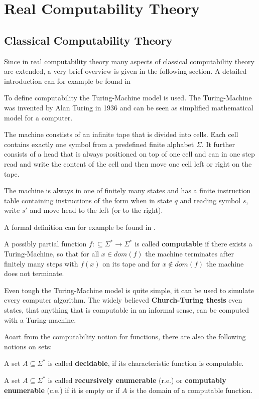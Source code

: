 \section{Real Computability Theory}\label{sec:real computability}
\subsection{Classical Computability Theory}
 Since in real computability theory many aspects of classical computability theory are extended, 
 a very brief overview is given in the following section. 
 A detailed introduction can for example be found in \cite{computability}

 To define computability the Turing-Machine model is used.
 The Turing-Machine was invented by Alan Turing in 1936 \cite{Turing} and can
 be seen as simplified mathematical model for a computer.

 The machine constists of an infinite tape that is divided into cells. 
 Each cell contains exactly one symbol from a predefined finite alphabet
 $\Sigma$.
 It further consists of a head that is always positioned on top of one cell 
 and can in one step read and write the content of the cell and then move one
 cell left or right on the tape.

 The machine is always in one of finitely many states and has a finite
 instruction table containing instructions of the form when in state $q$ and
 reading symbol $s$, write $s'$ and move head to the left (or to the right).

 A formal definition can for example be found in \cite{Hopmann}.
 
 \begin{definition}
 	A possibly partial function $f:\subseteq \Sigma^* \to \Sigma^*$ is called \textbf{computable} if there exists 
 	a Turing-Machine, so that for all $x \in dom(f)$ the machine terminates after finitely many steps with $f(x)$ on its 
 	tape and for $x \not \in dom(f)$ the machine does not terminate.
 \end{definition}

 Even tough the Turing-Machine model is quite simple, it can be used to
 simulate every computer algorithm.
 The widely believed \textbf{Church-Turing thesis} even states, that anything
 that is computable in an informal sense, can be computed with a
 Turing-machine.

 Aoart from the computability notion for functions, there are also the
following notions on sets:
 \begin{definition}
 	A set $A \subseteq \Sigma^*$ is called \textbf{decidable}, if its characteristic function is computable. 
 \end{definition}
 \begin{definition}
 	A set $A \subseteq \Sigma^*$ is called \textbf{recursively enumerable} (r.e.) or \textbf{computably enumerable} (c.e.) if 
 	it is empty or if $A$ is the domain of a computable function.   
 \end{definition}
